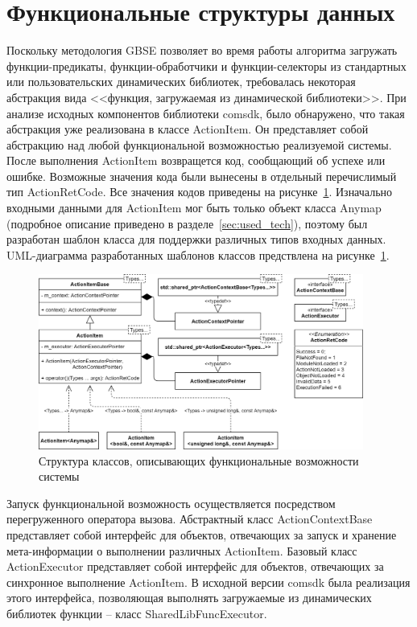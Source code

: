 \section{Функциональные структуры данных}\label{sec:functional_classes}
Поскольку методология GBSE позволяет во время работы алгоритма загружать функции-предикаты, функции-обработчики и функции-селекторы из стандартных или пользовательских динамических библиотек, требовалась некоторая абстракция вида <<функция, загружаемая из динамической библиотеки>>. При анализе исходных компонентов библиотеки comsdk, было обнаружено, что такая абстракция уже реализована в классе \textsf{ActionItem}. Он представляет собой абстракцию над любой функциональной возможностью реализуемой системы. После выполнения \textsf{ActionItem} возвращется код, сообщающий об успехе или ошибке. Возможные значения кода были вынесены в отдельный перечислимый тип \textsf{ActionRetCode}. Все значения кодов приведены на рисунке~\ref{fig:UMLActionItems}. Изначально входными данными для \textsf{ActionItem} мог быть только объект класса \textsf{Anymap} (подробное описание приведено в разделе~\ref{sec:used_tech}), поэтому был разработан шаблон класса для поддержки различных типов входных данных. UML-диаграмма разработанных шаблонов классов предствлена на рисунке~\ref{fig:UMLActionItems}.
\begin{figure}[!ht]
    \centering
    \includegraphics[width=0.95\textwidth]{figures/UML.actionItem.png}
    \caption{Структура классов, описывающих функциональные возможности системы}
    \label{fig:UMLActionItems}
\end{figure}

Запуск функциональной возможность осуществляется посредством перегруженного оператора вызова. Абстрактный класс \textsf{ActionContextBase} представляет собой интерфейс для объектов, отвечающих за запуск и хранение мета-информации о выполнении различных \textsf{ActionItem}. Базовый класс \textsf{ActionExecutor} представляет собой интерфейс для объектов, отвечающих за синхронное выполнение \textsf{ActionItem}. В исходной версии comsdk была реализация этого интерфейса, позволяющая выполнять загружаемые из динамических библиотек функции -- класс \textsf{SharedLibFuncExecutor}.

